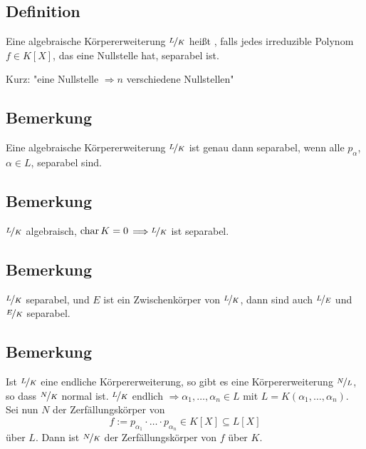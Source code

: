 
\subsection[Definition: Separable Körpererweiterung]{Definition} %
\label{sub:167}
Eine algebraische Körpererweiterung $\nicefrac{L}{K}$ heißt , falls jedes irreduzible Polynom $f \in K[X]$, das eine
Nullstelle hat, separabel ist.

Kurz: "{}eine Nullstelle $\Rightarrow n$ verschiedene Nullstellen"{}

\subsection[Bemerkung: Charakterisierung von separabel über die Minimalpolynome]{Bemerkung} %
\label{sub:168}
Eine algebraische Körpererweiterung $\nicefrac{L}{K}$ ist genau dann separabel, wenn alle $p_\alpha$, $ \alpha \in L$, separabel sind.

\subsection[Bemerkung: Algebraische Körpererweiterungen sind separabel, wenn $\Char K =0$]{Bemerkung} %
\label{sub:169}
$\nicefrac{L}{K}$ algebraisch, $\Char K =0$ $\Longrightarrow \nicefrac{L}{K}$ ist separabel. 

\subsection[Bemerkung: $\nicefrac{L}{K}$ separabel $\Rightarrow $ $\nicefrac{L}{E}, \nicefrac{E}{K}$ separabel]{Bemerkung} %
\label{sub:1610}
$\nicefrac{L}{K}$ separabel, und $E$ ist ein Zwischenkörper von $\nicefrac{L}{K}$, dann sind auch $\nicefrac{L}{E}$ und $\nicefrac{E}{K}$ separabel.

\subsection[Bemerkung: Endliche KE lassen sich zu normalen Körpererweiterungen ausbauen]{Bemerkung} %
\label{sub:1611}
Ist $\nicefrac{L}{K}$ eine endliche Körpererweiterung, so gibt es eine Körpererweiterung $\nicefrac{N}{L}$, so dass $\nicefrac{N}{K}$ normal ist. $\nicefrac{L}{K}$ endlich
$\Rightarrow \alpha_1, \ldots , \alpha_n \in L$ mit $L=K(\alpha_1, \ldots , \alpha_n)$. Sei nun $N$ der Zerfällungskörper von 
\[
	f := p_{\alpha_1} \cdot \ldots \cdot p_{\alpha_n} \in K[X] \subseteq L[X]
\]
über $L$. Dann ist $\nicefrac{N}{K}$ der Zerfällungskörper von $f$ über $K$.

